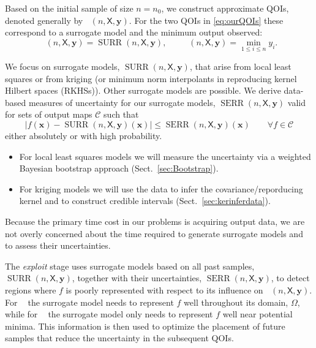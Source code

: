 \documentclass[11pt]{NSFamsart}
\DeclareMathOperator{\QOI}{QOI}
\DeclareMathOperator{\APP}{\widehat{\QOI}}
\DeclareMathOperator{\SURR}{SURR}
\DeclareMathOperator{\MIN}{MIN}
\DeclareMathOperator{\ID}{ID}
\DeclareMathOperator{\APPMIN}{\widehat{\MIN}}
\DeclareMathOperator{\APPID}{\widehat{\ID}}
\DeclareMathOperator{\SURRERR}{SERR}
\newcommand{\mX}{\mathsf{X}}
\newcommand{\bx}{{\boldsymbol{x}}}
\newcommand{\by}{{\boldsymbol{y}}}
\newcommand{\calc}{{\mathcal{C}}}
\def\abs#1{\ensuremath{\left \lvert #1 \right \rvert}}
\begin{document}
Based on the initial sample of size $n=n_0$, we construct approximate QOIs, denoted generally by  $\APP(n,\mX,\by)$.  For the two QOIs in \eqref{eq:ourQOIs} these correspond to a surrogate model and the minimum output observed:
\begin{equation} \label{eq:QOIhat}
    \APPID(n,\mX,\by) = \SURR(n,\mX,\by), \qquad \APPMIN(n,\mX,\by) = \min_{1 \le i \le n} y_i.
\end{equation}

We focus on surrogate models, $\SURR(n,\mX,\by)$, that arise from local least squares  or from kriging (or minimum norm interpolants in reproducing kernel Hilbert spaces (RKHSs)).  Other surrogate models are possible. We derive data-based measures of uncertainty for our surrogate models, $\SURRERR(n,\mX,\by)$ valid for sets of output maps $\calc$ such that 
\begin{equation}
    \abs{f(\bx)-\SURR(n,\mX,\by)(\bx)} \le \SURRERR(n,\mX,\by)(\bx) \qquad \forall f \in \calc
\end{equation}
either absolutely or with high probability.
\begin{itemize}
\item For local least squares models we will measure the uncertainty via a weighted Bayesian bootstrap approach (Sect.\ \ref{sec:Bootstrap}).
\item For kriging models we will use the data to infer the   covariance/reporducing kernel and to construct credible intervals (Sect.\ \ref{sec:kerinferdata}).
\end{itemize}
Because the primary time cost in our problems is acquiring output data, we are not overly concerned about the time required to generate surrogate models and to assess their uncertainties.

The \emph{exploit} stage uses surrogate models based on all past samples, $\SURR(n,\mX,\by)$, together with their uncertainties, $\SURRERR(n,\mX,\by)$, to detect regions where $f$ is poorly represented with respect to its influence on $\APP(n,\mX,\by)$.  For $\APPID$ the surrogate model needs to represent $f$ well throughout its domain, $\Omega$, while for $\APPMIN$ the surrogate model only needs to represent $f$ well near potential minima. This information is then used to optimize the placement of future samples that reduce the uncertainty in the subsequent  QOIs. 
\end{document}
